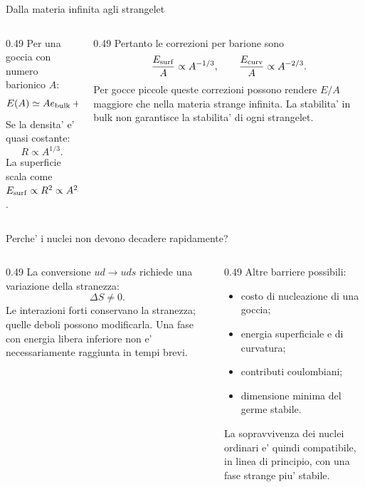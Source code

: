 \begin{frame}{Dalla materia infinita agli strangelet}
\small
\begin{columns}[T,onlytextwidth]
\begin{column}{0.49\textwidth}
Per una goccia con numero barionico $A$:
\[
E(A)\simeq Ae_{\rm bulk}
+E_{\rm surf}+E_{\rm curv}+E_{\rm Coul}.
\]
Se la densita' e' quasi costante:
\[
R\propto A^{1/3}.
\]
La superficie scala come
$E_{\rm surf}\propto R^2\propto A^{2/3}$.
\end{column}
\begin{column}{0.49\textwidth}
Pertanto le correzioni per barione sono
\[
\frac{E_{\rm surf}}A\propto A^{-1/3},
\qquad
\frac{E_{\rm curv}}A\propto A^{-2/3}.
\]
Per gocce piccole queste correzioni
possono rendere $E/A$ maggiore
che nella materia strange infinita.
\medskip
La stabilita' in bulk non garantisce
la stabilita' di ogni strangelet.
\end{column}
\end{columns}
\end{frame}

\begin{frame}{Perche' i nuclei non devono decadere rapidamente?}
\small
\begin{columns}[T,onlytextwidth]
\begin{column}{0.49\textwidth}
La conversione $ud\to uds$ richiede
una variazione della stranezza:
\[
\Delta S\ne0.
\]
Le interazioni forti conservano
la stranezza; quelle deboli possono
modificarla.
\medskip
Una fase con energia libera inferiore
non e' necessariamente raggiunta
in tempi brevi.
\end{column}
\begin{column}{0.49\textwidth}
Altre barriere possibili:
\begin{itemize}
\item costo di nucleazione di una goccia;
\item energia superficiale e di curvatura;
\item contributi coulombiani;
\item dimensione minima del germe stabile.
\end{itemize}
La sopravvivenza dei nuclei ordinari
e' quindi compatibile, in linea di principio,
con una fase strange piu' stabile.
\end{column}
\end{columns}
\end{frame}

